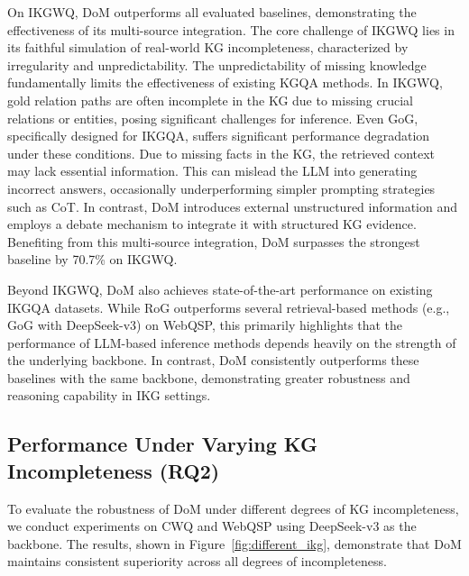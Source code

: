 On IKGWQ, DoM outperforms all evaluated baselines, demonstrating the effectiveness of its multi-source integration. The core challenge of IKGWQ lies in its faithful simulation of real-world KG incompleteness, characterized by irregularity and unpredictability. The unpredictability of missing knowledge fundamentally limits the effectiveness of existing KGQA methods. In IKGWQ, gold relation paths are often incomplete in the KG due to missing crucial relations or entities, posing significant challenges for inference. Even GoG, specifically designed for IKGQA, suffers significant performance degradation under these conditions. Due to missing facts in the KG, the retrieved context may lack essential information. This can mislead the LLM into generating incorrect answers, occasionally underperforming simpler prompting strategies such as CoT. In contrast, DoM introduces external unstructured information and employs a debate mechanism to integrate it with structured KG evidence. Benefiting from this multi-source integration, DoM surpasses the strongest baseline by 70.7\% on IKGWQ.


Beyond IKGWQ, DoM also achieves state-of-the-art performance on existing IKGQA datasets. While RoG outperforms several retrieval-based methods (e.g., GoG with DeepSeek-v3) on WebQSP, this primarily highlights that the performance of LLM-based inference methods depends heavily on the strength of the underlying backbone. In contrast, DoM consistently outperforms these baselines with the same backbone, demonstrating greater robustness and reasoning capability in IKG settings.



\subsection{Performance Under Varying KG Incompleteness (RQ2)}
To evaluate the robustness of DoM under different degrees of KG incompleteness, we conduct experiments on CWQ and WebQSP using DeepSeek-v3 as the backbone. The results, shown in Figure~\ref{fig:different_ikg}, demonstrate that DoM maintains consistent superiority across all degrees of incompleteness.

